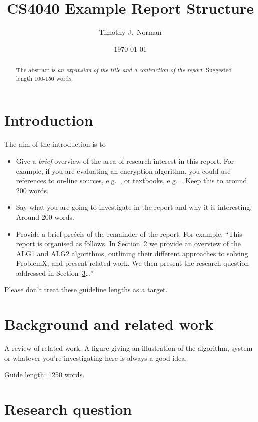 \documentclass{csfourzero}
\title{CS4040 Example Report Structure}
\author{Timothy J.\ Norman}
\date{\today}
\begin{document}
\maketitle

\begin{abstract}
  The abstract is \emph{an expansion of the title and a contraction of
  the report}. Suggested length 100-150 words.
\end{abstract}    

\section{Introduction}
\label{sec:intro}

The aim of the introduction is to
\begin{itemize}
\item Give a \emph{brief} overview of the area of research interest in
  this report. For example, if you are evaluating an encryption
  algorithm, you could use references to on-line sources,
  e.g.\ \cite{cryptowiki}, or textbooks,
  e.g.\ \cite{Stallings2010}. Keep this to around 200 words.
\item Say what you are going to investigate in the report and why it
  is interesting. Around 200 words.
\item Provide a brief pre\'{e}cis of the remainder of the report. For
  example, ``This report is organised as follows. In
  Section~\ref{sec:lit} we provide an overview of the ALG1 and ALG2
  algorithms, outlining their different approaches to solving
  ProblemX, and present related work. We then present the research
  question addressed in Section~\ref{sec:rq}\ldots''
\end{itemize}

Please don't treat these guideline lengths as a target.

\section{Background and related work}
\label{sec:lit}

A review of related work. A figure giving an illustration of the
algorithm, system or whatever you're investigating here is always a
good idea.

Guide length: 1250 words.

\section{Research question}
\label{sec:rq}
\end{document}
